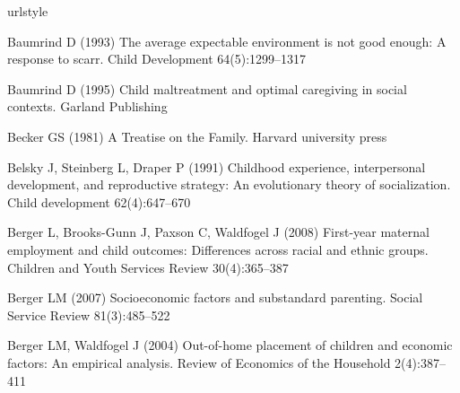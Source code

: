 

\begin{thebibliography}{50}
\providecommand{\natexlab}[1]{#1}
\providecommand{\url}[1]{{#1}}
\providecommand{\urlprefix}{URL }
\expandafter\ifx\csname urlstyle\endcsname\relax
  \providecommand{\doi}[1]{DOI~\discretionary{}{}{}#1}\else
  \providecommand{\doi}{DOI~\discretionary{}{}{}\begingroup
  \urlstyle{rm}\Url}\fi
\providecommand{\eprint}[2][]{\url{#2}}

Baumrind D (1993) The average expectable environment is not good enough: A
  response to scarr. Child Development 64(5):1299--1317

Baumrind D (1995) Child maltreatment and optimal caregiving in social contexts.
  Garland Publishing

Becker GS (1981) A Treatise on the Family. Harvard university press

Belsky J, Steinberg L, Draper P (1991) Childhood experience, interpersonal
  development, and reproductive strategy: An evolutionary theory of
  socialization. Child development 62(4):647--670

Berger L, Brooks-Gunn J, Paxson C, Waldfogel J (2008) First-year maternal
  employment and child outcomes: Differences across racial and ethnic groups.
  Children and Youth Services Review 30(4):365--387

Berger LM (2007) Socioeconomic factors and substandard parenting. Social
  Service Review 81(3):485--522

Berger LM, Waldfogel J (2004) Out-of-home placement of children and economic
  factors: An empirical analysis. Review of Economics of the Household
  2(4):387--411


\end{thebibliography}
